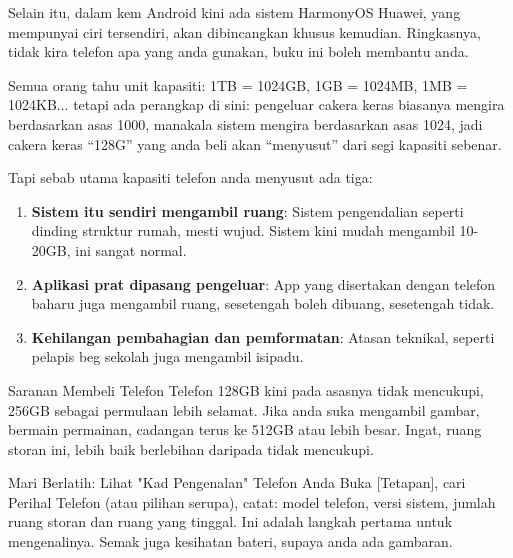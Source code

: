 Selain itu, dalam kem Android kini ada sistem HarmonyOS Huawei, yang mempunyai ciri tersendiri, akan dibincangkan khusus kemudian. Ringkasnya, tidak kira telefon apa yang anda gunakan, buku ini boleh membantu anda.


Semua orang tahu unit kapasiti: 1TB = 1024GB, 1GB = 1024MB, 1MB = 1024KB... tetapi ada perangkap di sini: pengeluar cakera keras biasanya mengira berdasarkan asas 1000, manakala sistem mengira berdasarkan asas 1024, jadi cakera keras “128G” yang anda beli akan “menyusut” dari segi kapasiti sebenar.

Tapi sebab utama kapasiti telefon anda menyusut ada tiga:

\begin{enumerate}
  \item \textbf{Sistem itu sendiri mengambil ruang}: Sistem pengendalian seperti dinding struktur rumah, mesti wujud. Sistem kini mudah mengambil 10-20GB, ini sangat normal.
  \item \textbf{Aplikasi prat dipasang pengeluar}: App yang disertakan dengan telefon baharu juga mengambil ruang, sesetengah boleh dibuang, sesetengah tidak.
  \item \textbf{Kehilangan pembahagian dan pemformatan}: Atasan teknikal, seperti pelapis beg sekolah juga mengambil isipadu.
\end{enumerate}

\begin{tcbinfo}{Saranan Membeli Telefon}
Telefon 128GB kini pada asasnya tidak mencukupi, 256GB sebagai permulaan lebih selamat. Jika anda suka mengambil gambar, bermain permainan, cadangan terus ke 512GB atau lebih besar. Ingat, ruang storan ini, lebih baik berlebihan daripada tidak mencukupi.

\end{tcbinfo}

\begin{tcbpractice}{Mari Berlatih: Lihat "Kad Pengenalan" Telefon Anda}
Buka [Tetapan], cari Perihal Telefon (atau pilihan serupa), catat: model telefon, versi sistem, jumlah ruang storan dan ruang yang tinggal. Ini adalah langkah pertama untuk mengenalinya. Semak juga kesihatan bateri, supaya anda ada gambaran.

\end{tcbpractice}


